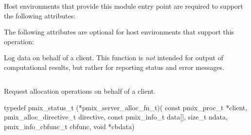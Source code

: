 Host environments that provide this module entry point are required to support the following attributes:


\reqattrend

\optattrstart
The following attributes are optional for host environments that support this operation:


\optattrend

\descr

Log data on behalf of a client. This function is \textit{not} intended for output of computational results, but rather for reporting status and error messages.


\subsection{}

\summary

Request allocation operations on behalf of a client.

\format

\cspecificstart
\begin{codepar}
typedef pmix_status_t (*pmix_server_alloc_fn_t)(
                             const pmix_proc_t *client,
                             pmix_alloc_directive_t directive,
                             const pmix_info_t data[], size_t ndata,
                             pmix_info_cbfunc_t cbfunc, void *cbdata)
\end{codepar}
\cspecificend

\begin{arglist}
\end{arglist}

